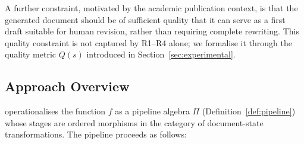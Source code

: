 A further constraint, motivated by the academic publication context, is that the
generated document should be of sufficient quality that it can serve as a first draft
suitable for human revision, rather than requiring complete rewriting.
This quality constraint is not captured by R1--R4 alone; we formalise it through the
quality metric $Q(s)$ introduced in Section~\ref{sec:experimental}.

\subsection{Approach Overview}

\sys{} operationalises the function $f$ as a pipeline algebra $\Pi$ (Definition~\ref{def:pipeline})
whose stages are ordered morphisms in the category of document-state transformations.
The pipeline proceeds as follows:

